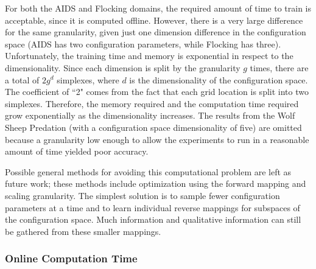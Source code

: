 For both the AIDS and Flocking domains, the required amount of time to train is acceptable, since it is computed offline.
However, there is a very large difference for the same granularity, given just one dimension difference in the configuration space (AIDS has two configuration parameters, while Flocking has three).
Unfortunately, the training time and memory is exponential in respect to the dimensionality.
Since each dimension is split by the granularity $g$ times, there are a total of $2 g^d$ simplexes, where $d$ is the dimensionality of the configuration space.
The coefficient of ``2" comes from the fact that each grid location is split into two simplexes.
Therefore, the memory required and the computation time required grow exponentially as the dimensionality increases.
The results from the Wolf Sheep Predation (with a configuration space dimensionality of five) are omitted because a granularity low enough to allow the experiments to run in a reasonable amount of time yielded poor accuracy.

Possible general methods for avoiding this computational problem are left as future work; these methods include optimization using the forward mapping and scaling granularity.
The simplest solution is to sample fewer configuration parameters at a time and to learn individual reverse mappings for subspaces of the configuration space.
Much information and qualitative information can still be gathered from these smaller mappings.


  \subsubsection{Online Computation Time}

